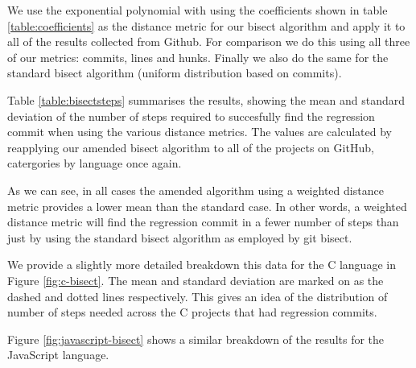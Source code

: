 \documentclass[10pt,journal,compsoc]{IEEEtran}
\begin{document}
We use the exponential polynomial with using the coefficients shown in table \ref{table:coefficients} as the distance metric for our bisect algorithm and apply it to all of the results collected from Github. For comparison we do this using all three of our metrics: commits, lines and hunks. Finally we also do the same for the standard bisect algorithm (uniform distribution based on commits).

Table \ref{table:bisectsteps} summarises the results, showing the mean and standard deviation of the number of steps required to succesfully find the regression commit when using the various distance metrics. The values are calculated by reapplying our amended bisect algorithm to all of the projects on GitHub, catergories by language once again.

As we can see, in all cases the amended algorithm using a weighted distance metric provides a lower mean than the standard case. In other words, a weighted distance metric will find the regression commit in a fewer number of steps than just by using the standard bisect algorithm as employed by {\code git bisect}.

We provide a slightly more detailed breakdown this data for the C language in Figure \ref{fig:c-bisect}. The mean and standard deviation are marked on as the dashed and dotted lines respectively. This gives an idea of the distribution of number of steps needed across the C projects that had regression commits.

Figure \ref{fig:javascript-bisect} shows a similar breakdown of the results for the JavaScript language.
\end{document}
